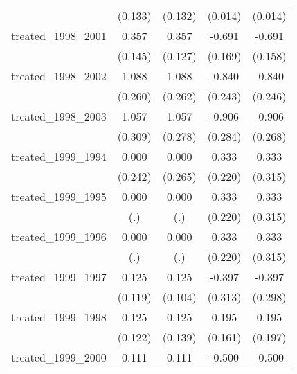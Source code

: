 {\begin{tabular}{l*{4}{c}}
            &     (0.133)         &     (0.132)         &     (0.014)         &     (0.014)         \\
[1em]
treated\_1998\_2001&       0.357\sym{*}  &       0.357\sym{**} &      -0.691\sym{***}&      -0.691\sym{***}\\
            &     (0.145)         &     (0.127)         &     (0.169)         &     (0.158)         \\
[1em]
treated\_1998\_2002&       1.088\sym{***}&       1.088\sym{***}&      -0.840\sym{***}&      -0.840\sym{***}\\
            &     (0.260)         &     (0.262)         &     (0.243)         &     (0.246)         \\
[1em]
treated\_1998\_2003&       1.057\sym{***}&       1.057\sym{***}&      -0.906\sym{**} &      -0.906\sym{***}\\
            &     (0.309)         &     (0.278)         &     (0.284)         &     (0.268)         \\
[1em]
treated\_1999\_1994&       0.000         &       0.000         &       0.333         &       0.333         \\
            &     (0.242)         &     (0.265)         &     (0.220)         &     (0.315)         \\
[1em]
treated\_1999\_1995&       0.000         &       0.000         &       0.333         &       0.333         \\
            &         (.)         &         (.)         &     (0.220)         &     (0.315)         \\
[1em]
treated\_1999\_1996&       0.000         &       0.000         &       0.333         &       0.333         \\
            &         (.)         &         (.)         &     (0.220)         &     (0.315)         \\
[1em]
treated\_1999\_1997&       0.125         &       0.125         &      -0.397         &      -0.397         \\
            &     (0.119)         &     (0.104)         &     (0.313)         &     (0.298)         \\
[1em]
treated\_1999\_1998&       0.125         &       0.125         &       0.195         &       0.195         \\
            &     (0.122)         &     (0.139)         &     (0.161)         &     (0.197)         \\
[1em]
treated\_1999\_2000&       0.111         &       0.111         &      -0.500         &      -0.500         \\

\end{tabular}}
